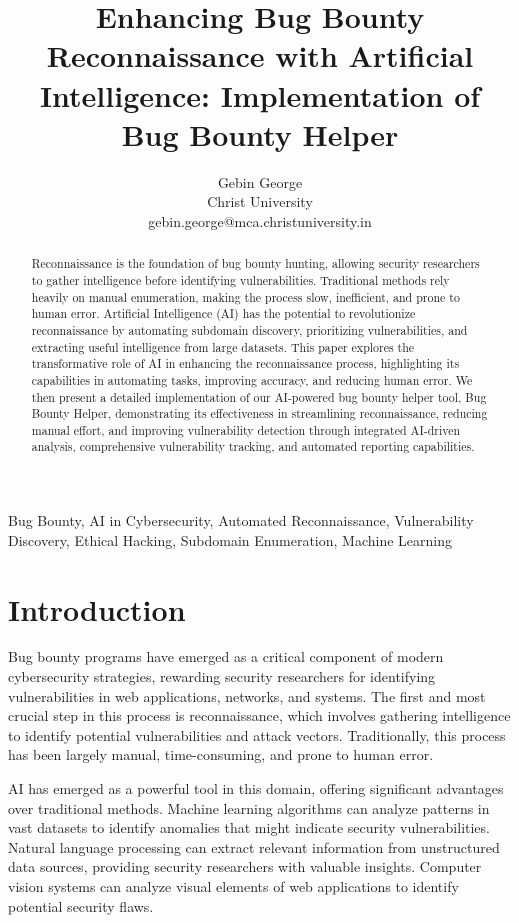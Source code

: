 \documentclass[conference]{IEEEtran}
\title{Enhancing Bug Bounty Reconnaissance with Artificial Intelligence: Implementation of Bug Bounty Helper}
\author{Gebin George\\ Christ University\\ gebin.george@mca.christuniversity.in}
\begin{document}
\maketitle

\begin{abstract}
Reconnaissance is the foundation of bug bounty hunting, allowing security researchers to gather intelligence before identifying vulnerabilities. Traditional methods rely heavily on manual enumeration, making the process slow, inefficient, and prone to human error. Artificial Intelligence (AI) has the potential to revolutionize reconnaissance by automating subdomain discovery, prioritizing vulnerabilities, and extracting useful intelligence from large datasets. This paper explores the transformative role of AI in enhancing the reconnaissance process, highlighting its capabilities in automating tasks, improving accuracy, and reducing human error. We then present a detailed implementation of our AI-powered bug bounty helper tool, Bug Bounty Helper, demonstrating its effectiveness in streamlining reconnaissance, reducing manual effort, and improving vulnerability detection through integrated AI-driven analysis, comprehensive vulnerability tracking, and automated reporting capabilities.
\end{abstract}

\begin{IEEEkeywords}
Bug Bounty, AI in Cybersecurity, Automated Reconnaissance, Vulnerability Discovery, Ethical Hacking, Subdomain Enumeration, Machine Learning
\end{IEEEkeywords}

\section{Introduction}
Bug bounty programs have emerged as a critical component of modern cybersecurity strategies, rewarding security researchers for identifying vulnerabilities in web applications, networks, and systems. The first and most crucial step in this process is reconnaissance, which involves gathering intelligence to identify potential vulnerabilities and attack vectors. Traditionally, this process has been largely manual, time-consuming, and prone to human error.

AI has emerged as a powerful tool in this domain, offering significant advantages over traditional methods. Machine learning algorithms can analyze patterns in vast datasets to identify anomalies that might indicate security vulnerabilities. Natural language processing can extract relevant information from unstructured data sources, providing security researchers with valuable insights. Computer vision systems can analyze visual elements of web applications to identify potential security flaws.
\end{document}
